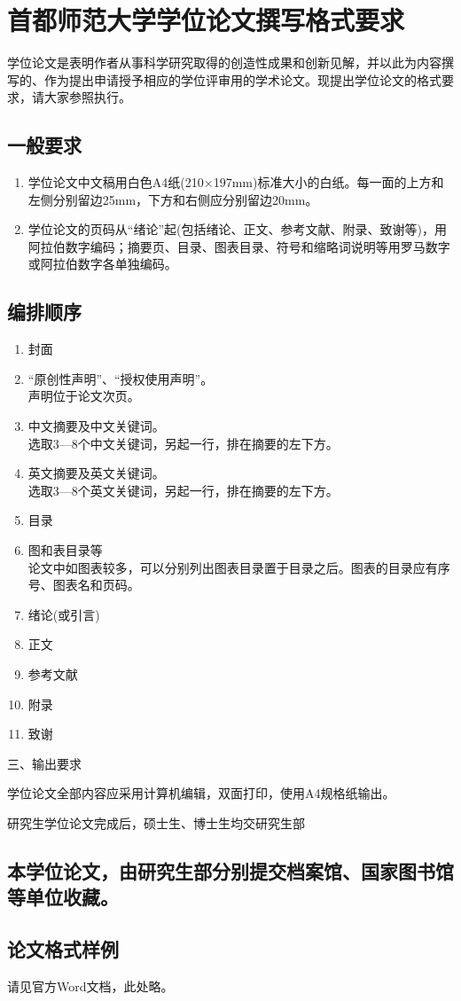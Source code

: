 \chapter{首都师范大学学位论文撰写格式要求}
\label{cha:engorg}
学位论文是表明作者从事科学研究取得的创造性成果和创新见解，并以此为内容撰写的、作为提出申请授予相应的学位评审用的学术论文。现提出学位论文的格式要求，请大家参照执行。

\section{一般要求}
\begin{enumerate}
\item 学位论文中文稿用白色A4纸(210×197mm)标准大小的白纸。每一面的上方和左侧分别留边25mm，下方和右侧应分别留边20mm。

\item 学位论文的页码从“绪论”起(包括绪论、正文、参考文献、附录、致谢等)，用阿拉伯数字编码；摘要页、目录、图表目录、符号和缩略词说明等用罗马数字或阿拉伯数字各单独编码。
\end{enumerate}

\section{编排顺序}
\begin{enumerate}
\item 封面
\item “原创性声明”、“授权使用声明”。\\
声明位于论文次页。
\item 中文摘要及中文关键词。\\
选取3—8个中文关键词，另起一行，排在摘要的左下方。
\item 英文摘要及英文关键词。\\
选取3—8个英文关键词，另起一行，排在摘要的左下方。
\item 目录
\item 图和表目录等\\
论文中如图表较多，可以分别列出图表目录置于目录之后。图表的目录应有序号、图表名和页码。
\item 绪论(或引言)
\item 正文
\item 参考文献
\item 附录
\item 致谢
\end{enumerate}
三、输出要求

学位论文全部内容应采用计算机编辑，双面打印，使用A4规格纸输出。\par

研究生学位论文完成后，硕士生、博士生均交研究生部

\section{本学位论文，由研究生部分别提交档案馆、国家图书馆等单位收藏。}
\section{论文格式样例}
请见官方Word文档，此处略。
